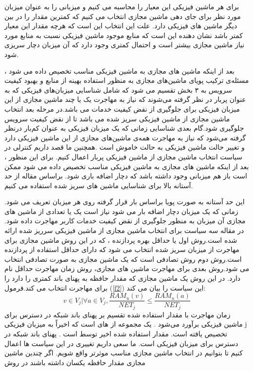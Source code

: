 برای هر ماشین فیزیکی این معیار را محاسبه می کنیم و میزبانی را به عنوان میزبان مورد نظر برای جای دهی ماشین مجازی انتخاب می کنیم که کمترین مقدار را در بین دیگر ماشین های فیزیکی دارد. علت این انتخاب این است که هرچه مقدار این معیار کمتر باشد نشان دهنده این است که منابع موجود ماشین فیزیکی نسبت به منابع مورد نیاز ماشین مجازی بیشتر است و احتمال کمتری وجود دارد که آن میزبان دچار سریزی شود. 


بعد از اینکه ماشین های مجازی به ماشین فیزیکی مناسب تخصیص داده می شود ، مسئله‌ی ترکیب پویای ماشین‌های مجازی به منظور استفاده بهینه از منابع و بهبود کیفیت سرویس به ۳ بخش تقسیم می شود که شامل شناسایی میزبان‌های فیزیکی که به عنوان پربار در نظر گرفته می‌شوند که نیاز به مهاجرت یک یا چند ماشین مجازی از این میزبان فیزیکی برای جلوگیری از نقض کیفیت خدمات می باشد.در مرحله بعد انتخاب ماشین مجازی از ماشین فیزیکی سریز شده می باشد تا از نقض کیفیت سرویس جلوگیری شود.گام بعدی شناسایی زمانی که یک میزبان فیزیکی به عنوان کم‌بار
 در‌نظر گرفته می‌شود که نیاز به مهاجرت همه‌ی ماشین‌های مجازی از این ماشین فیزیکی دارد و تغییر حالت ماشین فیزیکی به حالت خاموش است
\cite{num9,num15}
 .همچنین ما قصد داریم کنترلی در سیاست انتخاب ماشین مجازی از ماشین فیزیکی پربار اعمال کنیم. برای این منظور ، بعد از اینکه ماشین های مجازی به ماشین فیزیکی مناسب تخصیص داده می شود ممکن است باز هم میزبانی وجود داشته باشد که دچار اضافه باری شود. براساس مقاله 
\cite{num9,num15}
 از حد آستانه بالا
  برای شناسایی ماشین های سریز شده استفاده می کنیم. 

این حد آستانه به صورت پویا براساس بار قرار گرفته روی هر میزبان تعریف می شود. زمانی که یک میزبان دچار اضافه بار می شود نیاز است یک یا تعدادی از ماشین های مجازی آن میزبان به منظور جلوگیری از نقض کیفیت خدمات کاربر مهاجرت داده شود. در مقاله 
\cite{num15}
سه سیاست برای انتخاب ماشین مجازی از ماشین فیزیکی سرریز شده ارائه شده است.روش اول  
یا حداقل بهره پردازنده ، که در این روش ماشین مجازی برای مهاجرت از میزبان سریز شده انتخاب می شود که دارای حداقل استفاده از پردازنده است.روش دوم روش تصادفی است که یک ماشین مجازی به صورت تصادفی انتخاب می شود.روش بعدی برای مهاجرت ماشین های مجازی، روش زمان مهاجرت حداقل
نام دارد. در این روش یک ماشین مجازی که مقدار حافظه به پهنای باند کمتری را دارد را برای مهاجرت انتخاب می کند.فرمول
(\ref{f2})
 این سیاست را بیان می کند:
\cite{num15}
\begin{equation}
v\in V_j|\forall a \in V_j, \frac{RAM_u(v)}{NET_j} \leq \frac{RAM_u(a)}{NET_j}
\label{f2}
\end{equation}
زمان مهاجرت با مقدار
استفاده شده
تقسیم بر پهنای باند شبکه در دسترس برای ماشین فیزیکی
  برآورد می‌شود . یک مجموعه از
  های است که اخیراً به میزبان فیزیکی j  تخصیص یافته است.  مقدار 
  استفاده شده اخیر توسط
   است .  پهنای باند شبکه در دسترس برای میزبان فیزیکی 
    است.
ما سعی داریم تغییری در این سیاست ها اعمال کنیم تا بتوانیم در انتخاب ماشین مجازی مناسب موثرتر واقع شویم. اگر چندین ماشین مجازی مقدار حافظه یکسان داشته باشند در روش 

